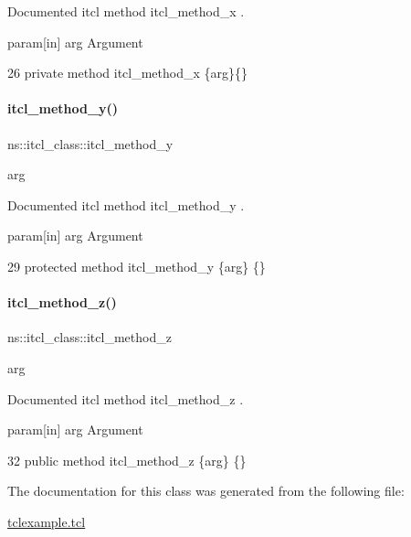 Documented itcl method {\ttfamily itcl\+\_\+method\+\_\+x} . 

param\mbox{[}in\mbox{]} arg Argument 
\begin{DoxyCode}
26     \textcolor{keyword}{private} \textcolor{keyword}{method} itcl\_method\_x \{arg\}\{\}
\end{DoxyCode}
\hypertarget{classns_1_1itcl__class_a092d0f8ed4796902e41fbeb1dfed82f1}{}\label{classns_1_1itcl__class_a092d0f8ed4796902e41fbeb1dfed82f1} 
\paragraph{\texorpdfstring{itcl\+\_\+method\+\_\+y()}{itcl\_method\_y()}}
{\footnotesize\ttfamily ns\+::itcl\+\_\+class\+::itcl\+\_\+method\+\_\+y\begin{DoxyParamCaption}\item[{}]{arg  }\end{DoxyParamCaption}}



Documented itcl method {\ttfamily itcl\+\_\+method\+\_\+y} . 

param\mbox{[}in\mbox{]} arg Argument 
\begin{DoxyCode}
29     \textcolor{keyword}{protected} \textcolor{keyword}{method} itcl\_method\_y \{arg\} \{\}
\end{DoxyCode}
\hypertarget{classns_1_1itcl__class_a13a383c766e489814960345540106cc1}{}\label{classns_1_1itcl__class_a13a383c766e489814960345540106cc1} 
\paragraph{\texorpdfstring{itcl\+\_\+method\+\_\+z()}{itcl\_method\_z()}}
{\footnotesize\ttfamily ns\+::itcl\+\_\+class\+::itcl\+\_\+method\+\_\+z\begin{DoxyParamCaption}\item[{}]{arg  }\end{DoxyParamCaption}}



Documented itcl method {\ttfamily itcl\+\_\+method\+\_\+z} . 

param\mbox{[}in\mbox{]} arg Argument 
\begin{DoxyCode}
32     \textcolor{keyword}{public} \textcolor{keyword}{method} itcl\_method\_z \{arg\} \{\}
\end{DoxyCode}


The documentation for this class was generated from the following file\+:\begin{DoxyCompactItemize}
\item 
\hyperlink{tclexample_8tcl}{tclexample.\+tcl}\end{DoxyCompactItemize}
